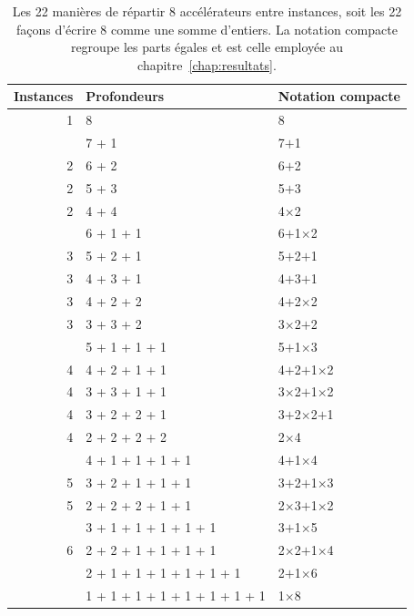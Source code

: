 \begin{table}[H]
\centering\small
\caption[Les 22 répartitions de 8 accélérateurs]{Les 22 manières de répartir 8 accélérateurs entre instances, soit les 22 façons d'écrire 8 comme une somme d'entiers. La notation compacte regroupe les parts égales et est celle employée au chapitre~\ref{chap:resultats}.}
\label{tab:ann_shapes}
\begin{tabular}{@{}rll@{}}
\toprule
Instances & Profondeurs & Notation compacte \\
\midrule
1 & 8 & 8 \\
\addlinespace[2pt]
2 & 7 + 1 & 7$+$1 \\
2 & 6 + 2 & 6$+$2 \\
2 & 5 + 3 & 5$+$3 \\
2 & 4 + 4 & 4$\times$2 \\
\addlinespace[2pt]
3 & 6 + 1 + 1 & 6$+$1$\times$2 \\
3 & 5 + 2 + 1 & 5$+$2$+$1 \\
3 & 4 + 3 + 1 & 4$+$3$+$1 \\
3 & 4 + 2 + 2 & 4$+$2$\times$2 \\
3 & 3 + 3 + 2 & 3$\times$2$+$2 \\
\addlinespace[2pt]
4 & 5 + 1 + 1 + 1 & 5$+$1$\times$3 \\
4 & 4 + 2 + 1 + 1 & 4$+$2$+$1$\times$2 \\
4 & 3 + 3 + 1 + 1 & 3$\times$2$+$1$\times$2 \\
4 & 3 + 2 + 2 + 1 & 3$+$2$\times$2$+$1 \\
4 & 2 + 2 + 2 + 2 & 2$\times$4 \\
\addlinespace[2pt]
5 & 4 + 1 + 1 + 1 + 1 & 4$+$1$\times$4 \\
5 & 3 + 2 + 1 + 1 + 1 & 3$+$2$+$1$\times$3 \\
5 & 2 + 2 + 2 + 1 + 1 & 2$\times$3$+$1$\times$2 \\
\addlinespace[2pt]
6 & 3 + 1 + 1 + 1 + 1 + 1 & 3$+$1$\times$5 \\
6 & 2 + 2 + 1 + 1 + 1 + 1 & 2$\times$2$+$1$\times$4 \\
\addlinespace[2pt]
7 & 2 + 1 + 1 + 1 + 1 + 1 + 1 & 2$+$1$\times$6 \\
\addlinespace[2pt]
8 & 1 + 1 + 1 + 1 + 1 + 1 + 1 + 1 & 1$\times$8 \\
\bottomrule
\end{tabular}
\end{table}

